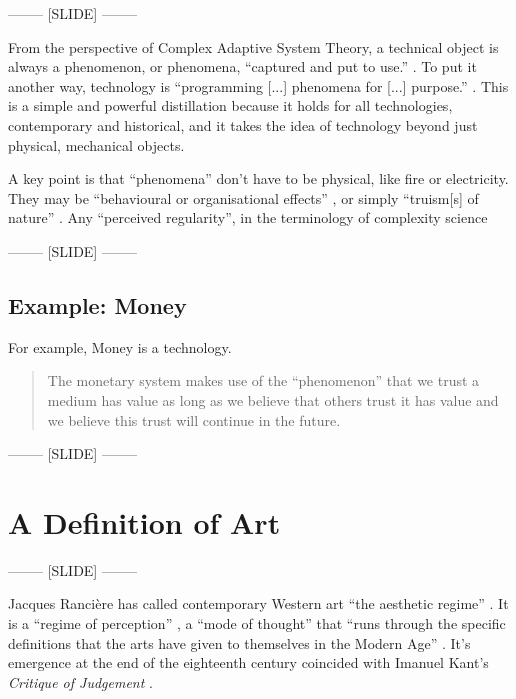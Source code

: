 \documentclass[letter:wpaper]{article}
\begin{document}
-------- [SLIDE] --------

    From the perspective of Complex Adaptive System Theory, a technical object is always a phenomenon, or phenomena, ``captured and put to use.'' \citep[p.53]{theNatureOfTechnology2009}. To put it another way, technology is ``programming [...] phenomena for [...] purpose.'' \citep[p.53]{theNatureOfTechnology2009}. This is a simple and powerful distillation because it holds for all technologies, contemporary and historical, and it takes the idea of technology beyond just physical, mechanical objects.
    
    A key point is that ``phenomena'' don't have to be physical, like fire or electricity. They may be ``behavioural or organisational effects'' \citep[p.55]{theNatureOfTechnology2009}, or simply ``truism[s] of nature'' \citep[p.45]{theNatureOfTechnology2009}. Any ``perceived regularity'', in the terminology of complexity science \citep[p.2]{FlackCrsGrnngAsDwnwrdCstn2021}

-------- [SLIDE] --------

    \subsection{Example: Money}

    For example, Money is a technology.

    \begin{quote}
        The monetary system makes use of the ``phenomenon'' that we trust a medium has value as long as we believe that others trust it has value and we believe this trust will continue in the future. \citep[p.55]{theNatureOfTechnology2009}
    \end{quote}

-------- [SLIDE] --------

\section{A Definition of Art}

-------- [SLIDE] --------

    Jacques Rancière has called contemporary Western art ``the aesthetic regime'' \citep[p.23]{RancierPltcsOfThAsthtcs2004}. It is a ``regime of perception'' \citep[p.xii]{RancièreAisthesis2013}, a ``mode of thought'' that ``runs through the specific definitions that the arts have given to themselves in the Modern Age'' \citep[p.23]{RancierPltcsOfThAsthtcs2004}. It's emergence at the end of the eighteenth century coincided with Imanuel Kant's \emph{Critique of Judgement} \citep[pp.23–24]{RancierPltcsOfThAsthtcs2004}. 
\end{document}

